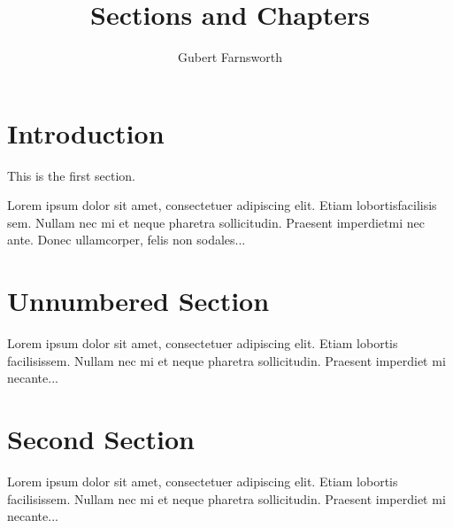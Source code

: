 \documentclass{article}
\title{Sections and Chapters}
\author{Gubert Farnsworth}
\date{ }
\begin{document}
  
\maketitle
  
\tableofcontents
\clearpage

\section{Introduction}
   
This is the first section.
      
Lorem  ipsum  dolor  sit  amet,  consectetuer  adipiscing  
elit.   Etiam  lobortisfacilisis sem.  Nullam nec mi et 
neque pharetra sollicitudin.  Praesent imperdietmi nec ante. 
Donec ullamcorper, felis non sodales...
       
\section*{Unnumbered Section}

Lorem ipsum dolor sit amet, consectetuer adipiscing elit.  
Etiam lobortis facilisissem.  Nullam nec mi et neque pharetra 
sollicitudin.  Praesent imperdiet mi necante...

\section{Second Section}
       
Lorem ipsum dolor sit amet, consectetuer adipiscing elit.  
Etiam lobortis facilisissem.  Nullam nec mi et neque pharetra 
sollicitudin.  Praesent imperdiet mi necante...
         
\end{document}
